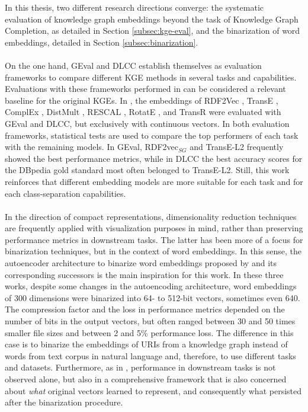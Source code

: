 \documentclass[11pt,titlepage,oneside,openany]{book}
\begin{document}
In this thesis, two different research directions converge: the systematic evaluation of knowledge graph embeddings beyond the task of Knowledge Graph Completion, as detailed in Section \ref{subsec:kge-eval}, and the binarization of word embeddings, detailed in Section \ref{subsec:binarization}.\\
\\
On the one hand, GEval \cite{pellegrino_geval_2020} and DLCC \cite{portisch_dlcc_2022} establish themselves as evaluation frameworks to compare different KGE methods in several tasks and capabilities. Evaluations with these frameworks performed in \cite{portisch_rdf2vec_2023, pellegrino_configurable_2019} can be considered a relevant baseline for the original KGEs. In \cite{portisch_rdf2vec_2023}, the embeddings of RDF2Vec \cite{ristoski_rdf2vec_2019}, TransE \cite{bordes_translating_2013}, ComplEx \cite{trouillon_complex_2016}, DistMult \cite{yang_embedding_2014}, RESCAL \cite{nickel_three-way_2011}, RotatE \cite{sun_rotate_2019}, and TransR \cite{lin_learning_2015} were evaluated with GEval and DLCC, but exclusively with continuous vectors. In both evaluation frameworks, statistical tests are used to compare the top performers of each task with the remaining models. In GEval, RDF2vec$_{SG}$ and TransE-L2 frequently showed the best performance metrics, while in DLCC the best accuracy scores for the DBpedia gold standard most often belonged to TransE-L2. Still, this work reinforces that different embedding models are more suitable for each task and for each class-separation capabilities.\\
\\
In the direction of compact representations, dimensionality reduction techniques are frequently applied with visualization purposes in mind, rather than preserving performance metrics in downstream tasks. The latter has been more of a focus for binarization techniques, but in the context of word embeddings. In this sense, the autoencoder architecture to binarize word embeddings proposed by \cite{tissier_near-lossless_2019} and its corresponding successors \cite{pan_relation_2021, navali_word_2020} is the main inspiration for this work. In these three works, despite some changes in the autoencoding architecture, word embeddings of 300 dimensions were binarized into 64- to 512-bit vectors, sometimes even 640. The compression factor and the loss in performance metrics depended on the number of bits in the output vectors, but often ranged between 30 and 50 times smaller file sizes and between 2 and 5\% performance loss. The difference in this case is to binarize the embeddings of URIs from a knowledge graph instead of words from text corpus in natural language and, therefore, to use different tasks and datasets. Furthermore, as in \cite{portisch_rdf2vec_2023}, performance in downstream tasks is not observed alone, but also in a comprehensive framework that is also concerned about \textit{what} original vectors learned to represent, and consequently what persisted after the binarization procedure.
\end{document}
